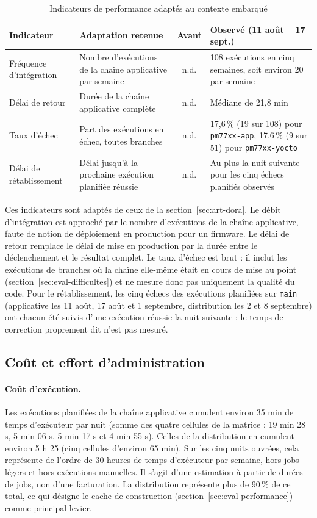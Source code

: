 \begin{table}[H]
\centering
\caption{Indicateurs de performance adaptés au contexte embarqué}
\label{tab:eval-dora}
\small
\begin{tabularx}{\textwidth}{@{}l X c X@{}}
\toprule
\textbf{Indicateur} & \textbf{Adaptation retenue} & \textbf{Avant} & \textbf{Observé (11 août -- 17 sept.)} \\
\midrule
Fréquence d'intégration & Nombre d'exécutions de la chaîne applicative par
  semaine & n.d. & 108 exécutions en cinq semaines, soit environ 20 par semaine \\
Délai de retour & Durée de la chaîne applicative complète & n.d. &
  Médiane de 21,8 min \\
Taux d'échec & Part des exécutions en échec, toutes branches &
  n.d. & 17,6\,\% (19 sur 108) pour \texttt{pm77xx-app}, 17,6\,\% (9 sur 51)
  pour \texttt{pm77xx-yocto} \\
Délai de rétablissement & Délai jusqu'à la prochaine exécution
  planifiée réussie & n.d. & Au plus la nuit suivante pour les cinq échecs
  planifiés observés \\
\bottomrule
\end{tabularx}
\end{table}

Ces indicateurs sont adaptés de ceux de la section~\ref{sec:art-dora}. Le
débit d'intégration est approché par le nombre d'exécutions de la chaîne
applicative, faute de notion de déploiement en production pour un firmware. Le
délai de retour remplace le délai de mise en production par la durée entre le
déclenchement et le résultat complet. Le taux d'échec est brut : il inclut les
exécutions de branches où la chaîne elle-même était en cours de mise au point
(section~\ref{sec:eval-difficultes}) et ne mesure donc pas uniquement la
qualité du code. Pour le rétablissement, les cinq échecs des exécutions
planifiées sur \texttt{main} (applicative les 11 août, 17 août et 1\ier{}
septembre, distribution les 2 et 8 septembre) ont chacun été suivis d'une exécution
réussie la nuit suivante ; le temps de correction proprement dit n'est pas
mesuré.

\subsection{Coût et effort d'administration}
\label{sec:eval-cout}

\paragraph{Coût d'exécution.} Les exécutions planifiées de la chaîne applicative
cumulent environ 35 min de temps d'exécuteur par nuit (somme des quatre cellules
de la matrice : 19 min 28 s, 5 min 06 s, 5 min 17 s et 4 min 55 s). Celles de la
distribution en cumulent environ 5 h 25 (cinq cellules d'environ 65 min). Sur
les cinq nuits ouvrées, cela représente de l'ordre de 30 heures de temps
d'exécuteur par semaine, hors jobs légers et hors exécutions manuelles. Il
s'agit d'une estimation à partir de durées de jobs, non d'une facturation. La
distribution représente plus de 90\,\% de ce total, ce qui désigne le cache de
construction (section~\ref{sec:eval-performance}) comme principal levier.

